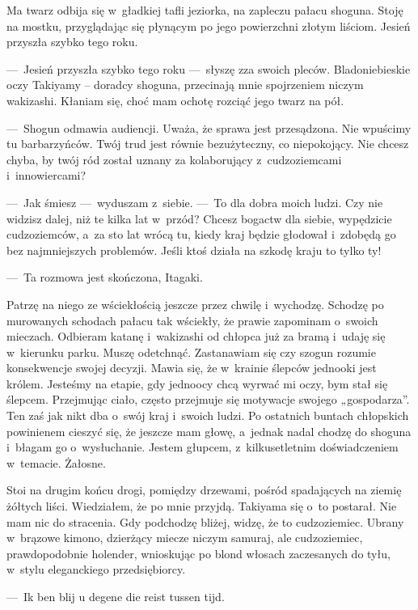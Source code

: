 \paraSep

Ma twarz odbija się w~gładkiej tafli jeziorka, na zapleczu pałacu shoguna. Stoję na mostku, przyglądając się płynącym po jego powierzchni złotym liściom. Jesień przyszła szybko tego roku.

---~Jesień przyszła szybko tego roku ---~słyszę zza swoich pleców. Bladoniebieskie oczy Takiyamy -- doradcy shoguna, przecinają mnie spojrzeniem niczym wakizashi. Kłaniam się, choć mam ochotę rozciąć jego twarz na pół.

---~Shogun odmawia audiencji. Uważa, że sprawa jest przesądzona. Nie wpuścimy tu barbarzyńców. Twój trud jest równie bezużyteczny, co niepokojący. Nie chcesz chyba, by twój ród został uznany za kolaborujący z~cudzoziemcami i~innowiercami?

---~Jak śmiesz ---~wyduszam z~siebie. ---~To dla dobra moich ludzi. Czy nie widzisz dalej, niż te kilka lat w~przód? Chcesz bogactw dla siebie, wypędzicie cudzoziemców, a~za sto lat wrócą tu, kiedy kraj będzie głodował i~zdobędą go bez najmniejszych problemów. Jeśli ktoś działa na szkodę kraju to tylko ty!

---~Ta rozmowa jest skończona, Itagaki.

Patrzę na niego ze wściekłością jeszcze przez chwilę i~wychodzę. Schodzę po murowanych schodach pałacu tak wściekły, że prawie zapominam o~swoich mieczach. Odbieram katanę i~wakizashi od chłopca już za bramą i~udaję się w~kierunku parku. Muszę odetchnąć. Zastanawiam się czy szogun rozumie konsekwencje swojej decyzji. Mawia się, że w~krainie ślepców jednooki jest królem. Jesteśmy na etapie, gdy jednoocy chcą wyrwać mi oczy, bym stał się ślepcem. Przejmując ciało, często przejmuje się motywacje swojego „gospodarza”. Ten zaś jak nikt dba o~swój kraj i~swoich ludzi. Po ostatnich buntach chłopskich powinienem cieszyć się, że jeszcze mam głowę, a~jednak nadal chodzę do shoguna i~błagam go o~wysłuchanie. Jestem głupcem, z~kilkusetletnim doświadczeniem w~temacie. Żałosne.

Stoi na drugim końcu drogi, pomiędzy drzewami, pośród spadających na ziemię żółtych liści. Wiedziałem, że po mnie przyjdą. Takiyama się o~to postarał. Nie mam nic do stracenia. Gdy podchodzę bliżej, widzę, że to cudzoziemiec. Ubrany w~brązowe kimono, dzierżący miecze niczym samuraj, ale cudzoziemiec, prawdopodobnie holender, wnioskując po blond włosach zaczesanych do tyłu, w~stylu eleganckiego przedsiębiorcy.

---~Ik ben blij u degene die reist tussen tijd.


